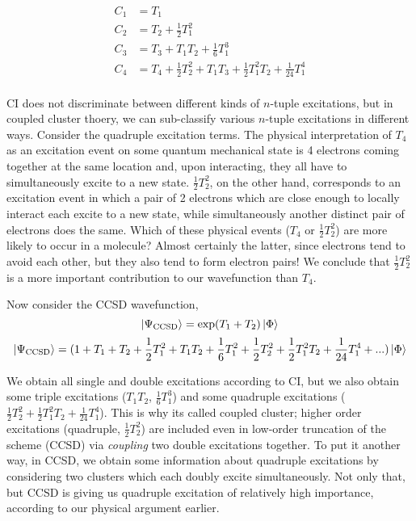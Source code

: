 \documentclass{article}
\begin{document}
\begin{align*}
C_1 &= T_1 \\
C_2 &= T_2 + \frac{1}{2} T_1^2 \\
C_3 &= T_3 + T_1 T_2 + \frac{1}{6} T_1^3 \\
C_4 &= T_4 + \frac{1}{2}T_2^2 + T_1 T_3 +  \frac{1}{2} T_1^2 T_2 + \frac{1}{24} T_1^4 \\
\end{align*}

CI does not discriminate between different kinds of $n$-tuple excitations,
but in coupled cluster thoery, we can sub-classify various $n$-tuple excitations 
in different ways. 
Consider the quadruple excitation terms.
The physical interpretation of $T_4$ as an excitation event on some 
quantum mechanical state is 4 electrons coming together at the same location
and, upon interacting, they all have to simultaneously excite to a new state.
$\frac{1}{2}T_2^2$, on the other hand, corresponds to an excitation event 
in which a pair of 2 electrons which are close enough to locally interact
each excite to a new state, while simultaneously another distinct pair of 
    electrons does the same.
Which of these physical events ($T_4$  or $\frac{1}{2}T_2^2$) are more likely 
    to occur in a molecule? 
Almost certainly the latter, since electrons tend to avoid each other, but they also
    tend to form electron pairs! 
We conclude that $\frac{1}{2}T_2^2$ is a more important contribution to our wavefunction
than $T_4$.

Now consider the CCSD wavefunction,
\[ \ket{\Psi_{\mathrm{CCSD}}} = \exp(T_1 + T_2) \ket{\Phi} \] 
\[ \ket{\Psi_{\mathrm{CCSD}}} = (1 + T_1 + T_2 + \frac{1}{2} T_1^2 + T_1 T_2 + 
 \frac{1}{6} T_1^2 + \frac{1}{2} T_2^2 + \frac{1}{2} T_1^2 T_2 + \frac{1}{24} T_1^4 + ...)    \ket{\Phi} \] 

We obtain all single and double excitations according to CI, but we also
obtain some triple excitations ($T_1 T_2$, $\frac{1}{6} T_1^3$) and some quadruple 
excitations ($\frac{1}{2} T_2^2 + \frac{1}{2} T_1^2 T_2 + \frac{1}{24} T_1^4 $).
This is why its called coupled cluster; higher order excitations 
(quadruple, $\frac{1}{2}T_2^2$) are included even in low-order truncation
of the scheme (CCSD) via \textit{coupling} two double excitations together.
To put it another way, in CCSD, we obtain some information about quadruple excitations 
by considering two clusters which each doubly excite simultaneously. 
Not only that, but CCSD is giving us quadruple excitation of relatively high importance,
according to our physical argument earlier. 
\end{document}
